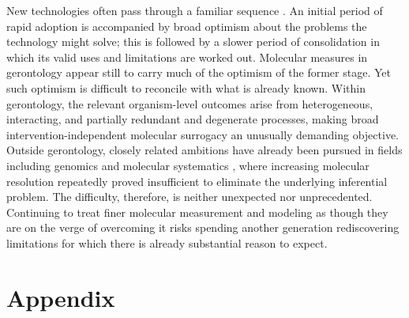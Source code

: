 \documentclass[twocolumn]{article} %
\begin{document}
New technologies often pass through a familiar sequence \citep[a]{manhart1992molecular}. An initial period of rapid adoption is accompanied by broad optimism about the problems the technology might solve; this is followed by a slower period of consolidation in which its valid uses and limitations are worked out. Molecular measures in gerontology appear still to carry much of the optimism of the former stage. Yet such optimism is difficult to reconcile with what is already known. Within gerontology, the relevant organism-level outcomes arise from heterogeneous, interacting, and partially redundant and degenerate processes, making broad intervention-independent molecular surrogacy an unusually demanding objective. Outside gerontology, closely related ambitions have already been pursued in fields including genomics and molecular systematics \citep[c]{manhart1992molecular}, where increasing molecular resolution repeatedly proved insufficient to eliminate the underlying inferential problem. The difficulty, therefore, is neither unexpected nor unprecedented. Continuing to treat finer molecular measurement and modeling as though they are on the verge of overcoming it risks spending another generation rediscovering limitations for which there is already substantial reason to expect.


\section{Appendix}
\end{document}
